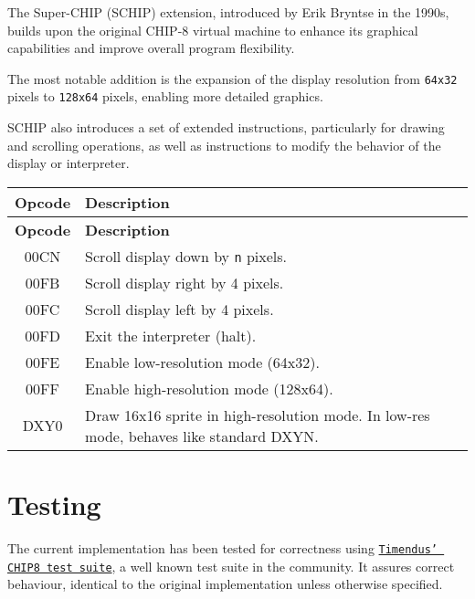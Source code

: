 \par The Super-CHIP (SCHIP) extension, introduced by Erik Bryntse in the 1990s, builds upon the original CHIP-8 virtual machine to enhance its graphical capabilities and improve overall program flexibility.

\par The most notable addition is the expansion of the display resolution from \texttt{64x32} pixels to \texttt{128x64} pixels, enabling more detailed graphics.

\par SCHIP also introduces a set of extended instructions, particularly for drawing and scrolling operations, as well as instructions to modify the behavior of the display or interpreter.

\begin{longtable}{|c|p{10cm}|}
\hline
\textbf{Opcode} & \textbf{Description} \\
\hline
\endfirsthead

\hline
\textbf{Opcode} & \textbf{Description} \\
\hline
\endhead

\hline
\endfoot

\hline
\endlastfoot

00CN & Scroll display down by \texttt{n} pixels. \\
00FB & Scroll display right by 4 pixels. \\
00FC & Scroll display left by 4 pixels. \\
00FD & Exit the interpreter (halt). \\
00FE & Enable low-resolution mode (64x32). \\
00FF & Enable high-resolution mode (128x64). \\
DXY0 & Draw 16x16 sprite in high-resolution mode. In low-res mode, behaves like standard DXYN. \\
\end{longtable}

\section{Testing}
\label{sec:ch3sec5}

\par The current implementation has been tested for correctness using \href{https://github.com/Timendus/chip8-test-suite}{\texttt{Timendus' CHIP8 test suite}}, a well known test suite in the community. It assures correct behaviour, identical to the original implementation unless otherwise specified. 

